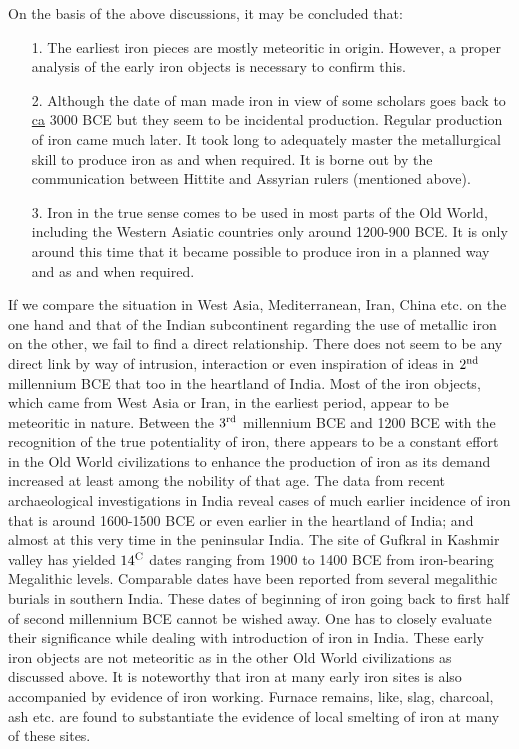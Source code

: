 {On the basis of the above discussions, it may be concluded that:
\begin{itemize}
\item[1.] The earliest iron pieces are mostly meteoritic in origin. However, a proper analysis of the early iron objects is necessary to confirm this.
\item[2.] Although the date of man made iron in view of some scholars goes back to \underline{ca} 3000 BCE but they seem to be incidental production. Regular production of iron came much later. It took long to adequately master the metallurgical skill to produce iron as and when required. It is borne out by the communication between Hittite and  Assyrian rulers (mentioned above).
\item[3.] Iron in the true sense comes to be used in most parts of the Old World, including the Western Asiatic countries only around 1200-900 BCE. It is only around this time that it became possible to produce iron in a planned way and as and when required.
\end{itemize}

If we compare the situation in West Asia, Mediterranean, Iran, China etc. on the one hand and that of the Indian subcontinent regarding the use of metallic iron on the other, we fail to find a direct relationship. There does not seem to be any direct link by way of intrusion, interaction or even inspiration of ideas in $2^{\rm nd}$ millennium BCE that too in the heartland of India. Most of the iron objects, which came from West Asia or Iran, in the earliest period, appear to be meteoritic in nature. Between the $3^{\rm rd}$ millennium BCE and 1200 BCE with the recognition of the true potentiality of iron, there appears to be a constant effort in the Old World civilizations to enhance the production of iron as its demand increased at least among the nobility of that age. The data from recent archaeological investigations in India reveal cases of much earlier incidence of iron that is around 1600-1500 BCE or even earlier in the heartland of India; and almost at this very time in the peninsular India. The site of Gufkral in Kashmir valley has yielded ${14}^{\rm C}$ dates ranging from 1900 to 1400 BCE from iron-bearing Megalithic levels. Comparable dates have been reported from several megalithic burials in southern India. These dates of beginning of iron going back to first half of second millennium BCE cannot be wished away. One has to closely evaluate their significance while dealing with introduction of iron in India. These early iron objects are not meteoritic as in the other Old World civilizations as discussed above. It is noteworthy that iron at many early iron sites is also accompanied by evidence of iron working. Furnace remains, like, slag, charcoal, ash etc. are found to substantiate the evidence of local smelting of iron at many of these sites. 

}
